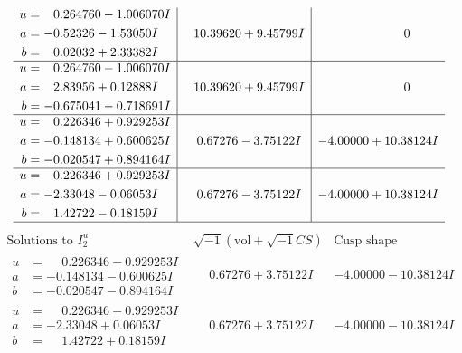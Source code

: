 \documentclass[1p]{elsarticle_modified}
\theoremstyle{definition}
\newcommand{\I}{\sqrt{-1}}
\begin{document}
$$\begin{array}{c|c|c}
\begin{aligned}
u &= \phantom{-}0.264760 - 1.006070 I \\
a &= -0.52326 - 1.53050 I \\
b &= \phantom{-}0.02032 + 2.33382 I\end{aligned}
 & \phantom{-}10.39620 + 9.45799 I & \phantom{-0.000000 } 0 \\ \hline\begin{aligned}
u &= \phantom{-}0.264760 - 1.006070 I \\
a &= \phantom{-}2.83956 + 0.12888 I \\
b &= -0.675041 - 0.718691 I\end{aligned}
 & \phantom{-}10.39620 + 9.45799 I & \phantom{-0.000000 } 0 \\ \hline\begin{aligned}
u &= \phantom{-}0.226346 + 0.929253 I \\
a &= -0.148134 + 0.600625 I \\
b &= -0.020547 + 0.894164 I\end{aligned}
 & \phantom{-}0.67276 - 3.75122 I & -4.00000 + 10.38124 I \\ \hline\begin{aligned}
u &= \phantom{-}0.226346 + 0.929253 I \\
a &= -2.33048 - 0.06053 I \\
b &= \phantom{-}1.42722 - 0.18159 I\end{aligned}
 & \phantom{-}0.67276 - 3.75122 I & -4.00000 + 10.38124 I\\
 \hline 
 \end{array}$$\newpage$$\begin{array}{c|c|c}  
\text{Solutions to }I^u_{2}& \I (\text{vol} + \sqrt{-1}CS) & \text{Cusp shape}\\
 \hline 
\begin{aligned}
u &= \phantom{-}0.226346 - 0.929253 I \\
a &= -0.148134 - 0.600625 I \\
b &= -0.020547 - 0.894164 I\end{aligned}
 & \phantom{-}0.67276 + 3.75122 I & -4.00000 - 10.38124 I \\ \hline\begin{aligned}
u &= \phantom{-}0.226346 - 0.929253 I \\
a &= -2.33048 + 0.06053 I \\
b &= \phantom{-}1.42722 + 0.18159 I\end{aligned}
 & \phantom{-}0.67276 + 3.75122 I & -4.00000 - 10.38124 I \\ \hline\begin{aligned}

\end{aligned}
\end{array}$$
\end{document}
